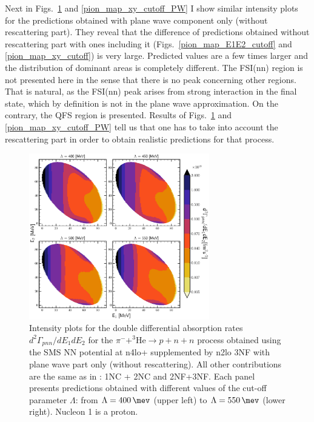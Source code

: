     Next in Figs.~\ref{pion_map_E1E2_cutoff_PW} and \ref{pion_map_xy_cutoff_PW} 
    I show similar intensity plots for the predictions obtained with plane wave component only (without rescattering part).
    They reveal that
    the difference of predictions obtained without rescattering part with ones including it
    (Figs.~\ref{pion_map_E1E2_cutoff} and \ref{pion_map_xy_cutoff}) is very large. 
    Predicted values are a few times larger and the distribution of dominant areas is completely different.
    The FSI(nn) region is not presented here
    in the sense that there is no peak concerning other regions.
    That is natural, as the FSI(nn) peak arises from strong interaction in the final state,
    which by definition is not in the plane wave approximation.
    On the contrary, the QFS region is presented.
    Results of Figs.~\ref{pion_map_E1E2_cutoff_PW} and \ref{pion_map_xy_cutoff_PW}
    tell us that one has to take into account the rescattering part in order to obtain
    realistic predictions for that process.  

    \begin{figure}[h]
        \begin{center}
        \includegraphics[width=0.7\textwidth]{PlotData/PION/Dalitz_maps/figures/Dalitz_map_pnn_E1E2_cutofs_PWIAS.pdf}
        \end{center}
        \caption{Intensity plots for the double differential absorption rates
        $d^2 \Gamma_{pnn}/dE_1dE_2$ for the $\pi^- + ^3\text{He} \rightarrow p + n + n$
        process obtained using the SMS NN potential at \gls{n4lo+} supplemented by \gls{n2lo} 3NF
        with plane wave part only (without rescattering).
        All other contributions are the same as in : 1NC + 2NC and 2NF+3NF.
        Each panel presents predictions obtained with different values of the cut-off parameter $\Lambda$:
        from $\Lambda=\SI{400}{\mev}$ (upper left) to $\Lambda=\SI{550}{\mev}$ (lower right). Nucleon 1 is a proton.}
        \label{pion_map_E1E2_cutoff_PW}
    \end{figure}

